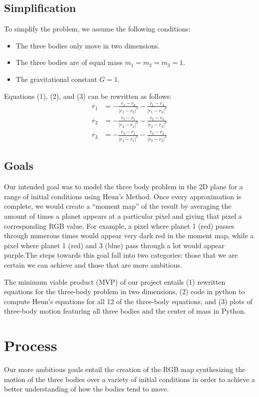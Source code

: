\documentclass{article}
\begin{document}
\subsection{Simplification}
To simplify the problem, we assume the following conditions:
\begin{itemize}
    \item The three bodies only move in two dimensions.
    \item The three bodies are of equal mass $m_1 = m_2 = m_3 = 1$.
    \item The gravitational constant $G = 1$.
\end{itemize}

Equations (1), (2), and (3) can be rewritten as follows:
\begin{align}
    \ddot{r_1} &= -\frac{r_1-r_2}{|r_1-r_2|^3}-\frac{r_1-r_3}{|r_1-r_3|^3}\\
    \ddot{r_2} &= -\frac{r_2-r_1}{|r_2-r_1|^3}-\frac{r_2-r_3}{|r_2-r_3|^3}\\
    \ddot{r_3} &= -\frac{r_3-r_1}{|r_3-r_1|^3}-\frac{r_3-r_2}{|r_3-r_2|^3}
\end{align}

\subsection{Goals}
Our intended goal was to model the three body problem in the 2D plane for a range of initial conditions using Heun's Method. Once every approximation is complete, we would create a “moment map” of the result by averaging the amount of times a planet appears at a particular pixel and giving that pixel a corresponding RGB value. For example, a pixel where planet 1 (red) passes through numerous times would appear very dark red in the moment map, while a pixel where planet 1 (red) and 3 (blue) pass through a lot would appear purple.The steps towards this goal fall into two categories: those that we are certain we can achieve and those that are more ambitious.


The minimum viable product (MVP) of our project entails (1) rewritten equations for the three-body problem in two dimensions, (2) code in python to compute Heun's equations for all 12 of the three-body equations, and (3) plots of three-body motion featuring all three bodies and the center of mass in Python. 

\section{Process}
Our more ambitious goals entail the creation of the RGB map synthesizing the motion of the three bodies over a variety of initial conditions in order to achieve a better understanding of how the bodies tend to move. 
\end{document}
